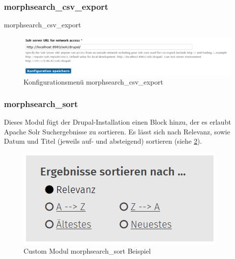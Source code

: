 \subsubsection{morphsearch\_csv\_export}\label{subsub:morphsearchcsv}
morphsearch\_csv\_export
\begin{figure}[H]
	\centering
	\includegraphics[width=0.70\linewidth]{images/config_searchcsv}
	\caption{Konfigurationsmenü morphsearch\_csv\_export}
	\label{fig:config_search}
\end{figure}



\newpage
\subsubsection{morphsearch\_sort}\label{subsub:morphsearchsort}
Dieses Modul fügt der Drupal-Installation einen Block hinzu, der es erlaubt Apache Solr Suchergebnisse zu sortieren. Es lässt sich nach Relevanz, sowie Datum und Titel (jeweils auf- und absteigend) sortieren (siehe \cref{fig:example_morphsearchsort}).


\begin{figure}[H]
	\centering
	\includegraphics[height=0.10\textheight]{images/example_morphsearchsort}
	\caption{Custom Modul morphsearch\_sort Beispiel}
	\label{fig:example_morphsearchsort}
\end{figure}

